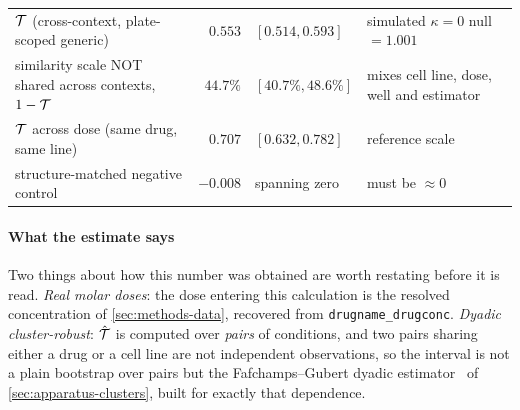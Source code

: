 \begin{table}[htbp]
\begin{lrbox}{\tvfb}
\begin{tabularx}{\textwidth}{@{}Z{1.12} r l Z{0.88}@{}}
 &  &  &  \\
\midrule
$\mathcal{T}$ (cross-context, plate-scoped generic) & $0.553$ & $[0.514, 0.593]$
  & simulated $\kappa{=}0$ null $= 1.001$ \\
similarity scale NOT shared across contexts, $1-\mathcal{T}$ & $44.7\%$
  & $[40.7\%, 48.6\%]$ & mixes cell line, dose, well and estimator \\
\addlinespace[10pt]
$\mathcal{T}$ across dose (same drug, same line) & $0.707$ & $[0.632, 0.782]$
  & reference scale \\
\addlinespace[10pt]
structure-matched negative control & $-0.008$ & spanning zero
  & must be $\approx 0$ \\
\end{tabularx}
\end{lrbox}
\end{table}
\paragraph{What the estimate says} Two things about how this number was obtained
are worth restating before it is read. \emph{Real molar doses}: the dose entering
this calculation is the resolved concentration of \cref{sec:methods-data},
recovered from \texttt{drugname\_drugconc}.
\emph{Dyadic cluster-robust}: $\hat{\mathcal{T}}$ is computed over \emph{pairs} of
conditions, and two pairs sharing either a drug or a cell line are not
independent observations, so the interval is not a plain bootstrap over pairs
but the Fafchamps--Gubert dyadic estimator~\cite{fafchamps2007dyadic} of \cref{sec:apparatus-clusters},
built for exactly that dependence.

